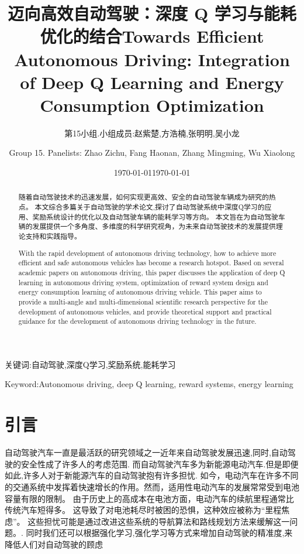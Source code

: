 \documentclass{article}
\begin{document}
\title{迈向高效自动驾驶：深度 Q 学习与能耗优化的结合}
\author{第15小组.小组成员:赵紫楚,方浩楠,张明明,吴小龙}
\date{\today}
\maketitle

\begin{abstract}
随着自动驾驶技术的迅速发展，如何实现更高效、安全的自动驾驶车辆成为研究的热点。
本文综合多篇关于自动驾驶的学术论文,探讨了自动驾驶系统中深度Q学习的应用、奖励系统设计的优化以及自动驾驶车辆的能耗学习等方向。
本文旨在为自动驾驶车辆的发展提供一个多角度、多维度的科学研究视角，为未来自动驾驶技术的发展提供理论支持和实践指导。
\end{abstract}

关键词:自动驾驶,深度Q学习,奖励系统,能耗学习


\title{Towards Efficient Autonomous Driving: Integration of Deep Q Learning and Energy Consumption Optimization}
\author{Group 15. Panelists: Zhao Zichu, Fang Haonan, Zhang Mingming, Wu Xiaolong}
\date{\today}
\maketitle
\begin{abstract}
With the rapid development of autonomous driving technology, how to achieve more efficient and safe autonomous vehicles has become a research hotspot.
Based on several academic papers on autonomous driving, this paper discusses the application of deep Q learning in autonomous driving system, optimization of reward system design and energy consumption learning of autonomous driving vehicle.
This paper aims to provide a multi-angle and multi-dimensional scientific research perspective for the development of autonomous vehicles, and provide theoretical support and practical guidance for the development of autonomous driving technology in the future.
\end{abstract}

Keyword:Autonomous driving, deep Q learning, reward systems, energy learning

\section{引言}
自动驾驶汽车一直是最活跃的研究领域之一\cite{paden2016survey}近年来自动驾驶发展迅速,同时,自动驾驶的安全性成了许多人的考虑范围.
而自动驾驶汽车多为新能源电动汽车.但是即便如此,许多人对于新能源汽车的自动驾驶抱有许多担忧.
如今，电动汽车在许多不同的交通系统中发挥着快速增长的作用。然而，适用性电动汽车的发展常常受到电池容量有限的限制。
由于历史上的高成本在电池方面，电动汽车的续航里程通常比传统汽车短得多。
这导致了对电池耗尽时被困的恐惧，这种效应被称为“里程焦虑”。
这些担忧可能是通过改进这些系统的导航算法和路线规划方法来缓解这一问题。\cite{AKERBLOM2023103879}.
同时我们还可以根据强化学习,强化学习等方式来增加自动驾驶的精准度,来降低人们对自动驾驶的顾虑
\end{document}
